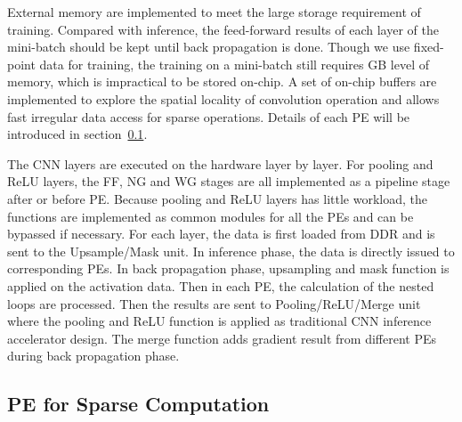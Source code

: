 External memory are implemented to meet the large storage requirement of training. Compared with inference, the feed-forward results of each layer of the mini-batch should be kept until back propagation is done. Though we use fixed-point data for training, the training on a mini-batch still requires GB level of memory, which is impractical to be stored on-chip. A set of on-chip buffers are implemented to explore the spatial locality of convolution operation and allows fast irregular data access for sparse operations. Details of each PE will be introduced in section~\ref{sec:hw_pe}.

The CNN layers are executed on the hardware layer by layer. For pooling and ReLU layers, the FF, NG and WG stages are all implemented as a pipeline stage after or before PE. Because pooling and ReLU layers has little workload, the functions are implemented as common modules for all the PEs and can be bypassed if necessary. For each layer, the data is first loaded from DDR and is sent to the Upsample/Mask unit. In inference phase, the data is directly issued to corresponding PEs. In back propagation phase, upsampling and mask function is applied on the activation data. Then in each PE, the calculation of the nested loops are processed. Then the results are sent to Pooling/ReLU/Merge unit where the pooling and ReLU function is applied as traditional CNN inference accelerator design. The merge function adds gradient result from different PEs during back propagation phase.

\subsection{PE for Sparse Computation}\label{sec:hw_pe}

